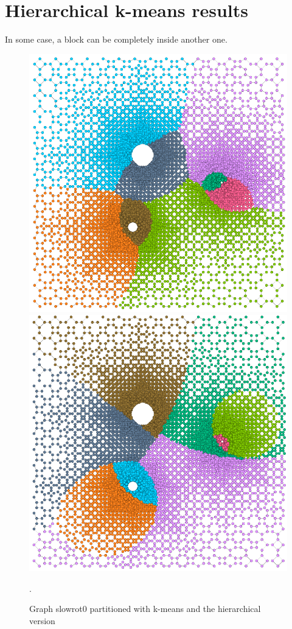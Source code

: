 \documentclass[a4paper,10pt]{article}
\begin{document}
\section*{Hierarchical k-means results}

In some case, a block can be completely inside another one.

\begin{figure}
\includegraphics[scale=0.3]{slowrot_KMeans_k8.png}
\includegraphics[scale=0.3]{slowrot_HKMeans_k8.png}
\caption{Graph slowrot0 partitioned  with k-means and the hierarchical version }.
\end{figure}
\end{document}

